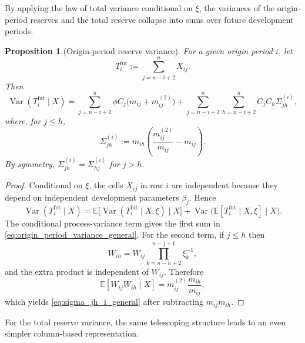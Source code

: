 \documentclass[11pt]{article}
\newtheorem{proposition}[theorem]{Proposition}
\newcommand{\E}{\mathbb{E}}
\newcommand{\Var}{\operatorname{Var}}
\newcommand{\1}{\mathbf{1}}
\begin{document}
By applying the law of total variance conditional on $\xi$, the variances of the origin-period reserves and the total reserve collapse into sums over future development periods.

\begin{proposition}[Origin-period reserve variance]\label{prop:origin_period_variance_general}
For a given origin period $i$, let
\begin{equation}
T_i^{\mathrm{fut}}:=\sum_{j=n-i+2}^{n} X_{ij}.
\end{equation}
Then
\begin{equation}
\Var(T_i^{\mathrm{fut}}\mid X)
=
\sum_{j=n-i+2}^{n}\phi C_j\bigl(m_{ij}+m_{ij}^{(2)}\bigr)
+
\sum_{j=n-i+2}^{n}\sum_{h=n-i+2}^{n} C_jC_h\Sigma_{jh}^{(i)},
\label{eq:origin_period_variance_general}
\end{equation}
where, for $j\le h$,
\begin{equation}
\Sigma_{jh}^{(i)}
:=
m_{ih}\left(\frac{m_{ij}^{(2)}}{m_{ij}}-m_{ij}\right).
\label{eq:sigma_jh_i_general}
\end{equation}
By symmetry, $\Sigma_{jh}^{(i)}=\Sigma_{hj}^{(i)}$ for $j>h$.
\end{proposition}

\begin{proof}
Conditional on $\xi$, the cells $X_{ij}$ in row $i$ are independent because they depend on independent development parameters $\beta_j$. Hence
\begin{equation}
\Var(T_i^{\mathrm{fut}}\mid X)
=
\E\bigl[\Var(T_i^{\mathrm{fut}}\mid X,\xi)\mid X\bigr]
+
\Var\bigl(\E[T_i^{\mathrm{fut}}\mid X,\xi]\mid X\bigr).
\end{equation}
The conditional process-variance term gives the first sum in \eqref{eq:origin_period_variance_general}. For the second term, if $j\le h$ then
\begin{equation}
W_{ih}
=
W_{ij}\prod_{k=n-h+2}^{n-j+1}\xi_k^{-1},
\end{equation}
and the extra product is independent of $W_{ij}$. Therefore
\begin{equation}
\E[W_{ij}W_{ih}\mid X]
=
m_{ij}^{(2)}\frac{m_{ih}}{m_{ij}},
\end{equation}
which yields \eqref{eq:sigma_jh_i_general} after subtracting $m_{ij}m_{ih}$.
\end{proof}

For the total reserve variance, the same telescoping structure leads to an even simpler column-based representation.
\end{document}
